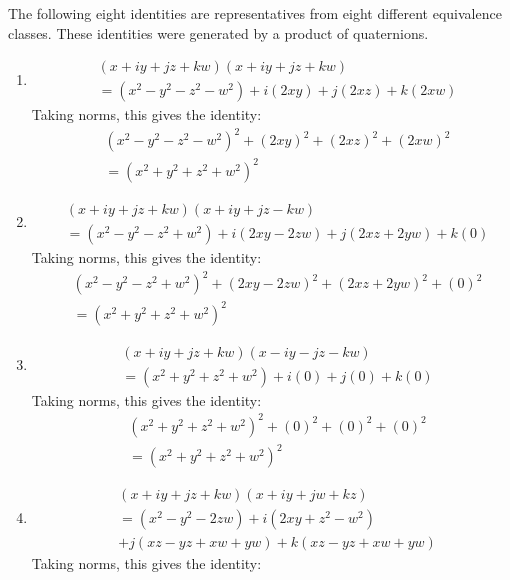 \documentclass[12pt]{article}
\theoremstyle{definition}
\numberwithin{equation}{section}
\begin{document}
The following eight identities are representatives from 
eight different equivalence classes. These identities
were generated by a product of quaternions. 

\begin{enumerate}[{Identity} I:]
\item
    \begin{align*}
    &(x + iy + jz + kw)(x + iy + jz + kw) \\
    &= (x^2 - y^2 - z^2 - w^2 ) + i(2xy) + j(2xz) + k(2xw) 
    \end{align*}
Taking norms, this gives the identity:
    \begin{align*}
    &(x^2 - y^2 - z^2 - w^2 )^2 + (2xy)^2 + (2xz)^2 + (2xw)^2 \\
    &= (x^2 + y^2 + z^2 + w^2)^2
    \end{align*}
\item
    \begin{align*}
    &(x + iy + jz + kw)(x + iy + jz - kw) \\
    &= (x^2 - y^2 - z^2 + w^2 ) + i(2xy - 2zw) + j(2xz + 2yw) + k(0) 
    \end{align*}
Taking norms, this gives the identity:
    \begin{align*}
    &(x^2 - y^2 - z^2 + w^2 )^2 + (2xy - 2zw)^2 + (2xz + 2yw)^2 + (0)^2\\ 
    &= (x^2 + y^2 + z^2 + w^2)^2
    \end{align*}
\item
    \begin{align*}
    &(x + iy + jz + kw)(x - iy - jz - kw) \\
    &= (x^2 + y^2 + z^2 + w^2 ) + i(0) + j(0) + k(0) 
    \end{align*}
Taking norms, this gives the identity:
    \begin{align*}
    &(x^2 + y^2 + z^2 + w^2 )^2 + (0)^2 + (0)^2 + (0)^2 \\
    &= (x^2 + y^2 + z^2 + w^2)^2
    \end{align*}
\item
    \begin{align*}
    &(x + iy + jz + kw)(x + iy + jw + kz) \\
    &= (x^2 - y^2 - 2zw ) + i(2xy + z^2 -w^2) \\
        &+ j(xz - yz + xw + yw) + k(xz - yz + xw + yw) 
    \end{align*}
Taking norms, this gives the identity:

\end{enumerate}
\end{document}
